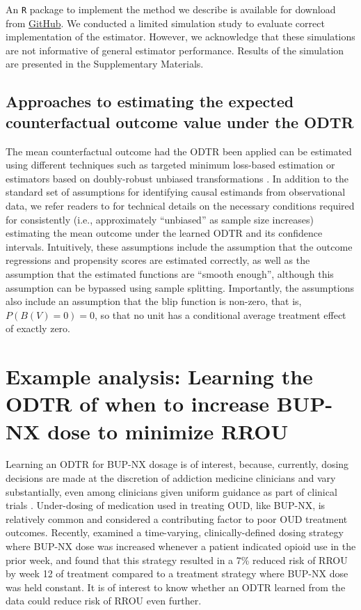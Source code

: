 \documentclass[11pt]{article}
\theoremstyle{example}
\begin{document}
An \texttt{R} package to implement the method we describe is available for download from \href{https://github.com/Rudolph-et-al-MSPH-Epidemiology/odtr}{GitHub}. We conducted a limited simulation study to evaluate correct implementation of the estimator. However, we acknowledge that these simulations are not informative of general estimator performance. Results of the simulation are presented in the Supplementary Materials. 

\subsection*{Approaches to estimating the expected counterfactual outcome value under the ODTR}

The mean counterfactual outcome had the ODTR been applied can be estimated using different techniques such as targeted minimum loss-based estimation \citep{tmleLong, van2015targeted} or estimators based on doubly-robust unbiased transformations \citep{luedtke2018sequential}. In addition to the standard set of assumptions for identifying causal estimands from observational data, we refer readers to \citet{van2015targeted} for technical details on the necessary conditions required for consistently (i.e., approximately ``unbiased'' as sample size increases) estimating the mean outcome under the learned ODTR and its confidence intervals. Intuitively, these assumptions include the assumption that the outcome regressions and propensity scores are estimated correctly, as well as the assumption that the estimated functions are ``smooth enough'', although this assumption can be bypassed using sample splitting.\cite{van2011cross} Importantly, the assumptions also include an assumption that the blip function is non-zero, that is, $P(B(V)=0)=0$, so that no unit has a conditional average treatment effect of exactly zero. 

\section*{Example analysis: Learning the ODTR of when to increase BUP-NX dose to minimize RROU}

Learning an ODTR for BUP-NX dosage is of interest, because, currently, dosing decisions are made at the discretion of addiction medicine clinicians and vary substantially, even among clinicians given uniform guidance as part of clinical trials \citep{rudolph2022dose}. Under-dosing of medication used in treating OUD, like BUP-NX, is relatively common and considered a contributing factor to poor OUD treatment outcomes. \citep{gordon2015patterns,d2019evidence} Recently, \citet{rudolph2022dose} examined a time-varying, clinically-defined dosing strategy where BUP-NX dose was increased whenever a patient indicated opioid use in the prior week, and found that this strategy resulted in a 7\% reduced risk of RROU by week 12 of treatment compared to a treatment strategy where BUP-NX dose was held constant. It is of interest to know whether an ODTR learned from the data could reduce risk of RROU even further. 
\end{document}
